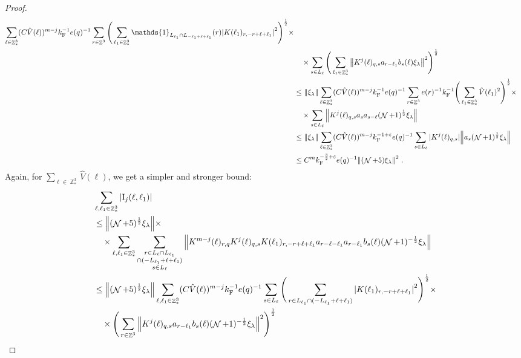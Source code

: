 \documentclass[12pt,a4paper]{article}
\numberwithin{equation}{section}
\newcommand{\1}{\mathbb{I}}
\newcommand{\F}{\mathrm{F}}
\newcommand{\I}{\mathrm{I}}
\DeclareMathOperator{\Z}{\mathbb{Z}}
\DeclareMathOperator{\NN}{\mathcal{N}}
\newcommand{\half}{\frac{1}{2}}
\theoremstyle{plain}
\theoremstyle{definition}
\theoremstyle{remark}
\theoremstyle{plain}
\theoremstyle{definition}
\theoremstyle{remark}
\begin{document}
\begin{proof}
{\begin{align}
		\sum_{\ell \in \Z^3_*}
		(C \hat{V}(\ell))^{m-j} k_{\F}^{-1} e(q)^{-1}
		\sum\limits_{r \in \Z^3} \Bigg(\sum_{\ell_1 \in \Z^3_*} \mathds{1}_{L_{\ell_1} \cap L_{-\ell_1+\ell+\ell_1}}(r) \abs{ K(\ell_1)_{r,-r+\ell+\ell_1} }^2\Bigg)^\half \times\nonumber\\ 
	&\quad \times \sum\limits_{s\in L_{\ell}} \Bigg( \sum_{\ell_1 \in \Z^3_*} \norm{K^{j}(\ell)_{q,s} a_{r-\ell_1} b_{s}(\ell) \xi_\lambda }^2 \Bigg)^\half \nonumber\\
	&\leq \norm{ \xi_\lambda} 
		\sum_{\ell \in \Z^3_*}
		(C \hat{V}(\ell))^{m-j} k_{\F}^{-1} e(q)^{-1}
		\sum\limits_{r \in \Z^3} e(r)^{-1} k_{\F}^{-1} \Bigg(\sum_{\ell_1 \in \Z^3_*} \hat{V}(\ell_1)^2 \Bigg)^\half \times\nonumber\\ 
	&\quad \times \sum\limits_{s\in L_{\ell}} \norm{K^{j}(\ell)_{q,s} a_s a_{s-\ell} (\NN+1)^{\half} \xi_\lambda } \nonumber\\
	&\leq \norm{ \xi_\lambda} 
		\sum_{\ell \in \Z^3_*}
		(C \hat{V}(\ell))^{m-j} k_{\F}^{-1+\varepsilon} e(q)^{-1}
		\sum\limits_{s\in L_{\ell}} |K^{j}(\ell)_{q,s}| \norm{a_s (\NN+1)^{\half} \xi_\lambda } \nonumber\\
	&\leq C^m k_{\F}^{-\frac 32 + \varepsilon} e(q)^{-1} \norm{(\NN+5) \xi_\lambda }^2 \;.
\end{align}
}
Again, for $ \sum_{\ell \in \Z^3_*} \hat{V}(\ell) $, we get a simpler and stronger bound:
\begin{align}
	&\sum_{\ell,\ell_1 \in \Z^3_*} |\I_j(\ell, \ell_1)| \nonumber\\
	&\leq \norm{ (\NN+5)^{\half} \xi_\lambda} \times \nonumber\\
	&\quad \times \sum_{\ell,\ell_1 \in \Z^3_*} \sum\limits_{\substack{r\in L_{\ell} \cap L_{\ell_1} \\ \cap (-L_{\ell_1} + \ell + \ell_1)\\s\in L_{\ell}}}
		\norm{K^{m-j}(\ell)_{r,q} K^j(\ell)_{q,s} K(\ell_1)_{r,-r+\ell+\ell_1} a_{r-\ell-\ell_1} a_{r-\ell_1} b_{s}(\ell) (\NN+1)^{-\half} \xi_\lambda }\nonumber\\
	&\leq \norm{ (\NN+5)^{\half} \xi_\lambda} 
		\sum_{\ell,\ell_1 \in \Z^3_*} (C \hat{V}(\ell))^{m-j} k_{\F}^{-1} e(q)^{-1}
		\sum\limits_{s\in L_{\ell}} 
		\Bigg(\sum\limits_{r\in L_{\ell_1} \cap (-L_{\ell_1} + \ell + \ell_1)}\abs{ K(\ell_1)_{r,-r+\ell+\ell_1} }^2\Bigg)^\half \times\nonumber\\ 
	&\quad \times\Bigg( \sum\limits_{r \in \Z^3}\norm{K^{j}(\ell)_{q,s} a_{r-\ell_1} b_{s}(\ell) (\NN+1)^{-\half} \xi_\lambda }^2 \Bigg)^\half \nonumber\\

\end{align}
\end{proof}
\end{document}
